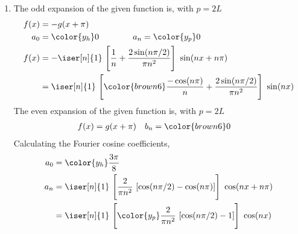 \begin{enumerate}
    \item The odd expansion of the given function is, with $  p = 2L $
          \begin{align}
              f(x) & = -g(x + \pi)                                                     \\
              a_0  & = {\color{y_h} 0} \qquad\qquad
              a_n = {\color{y_p} 0}                                                    \\
              f(x) & = -\iser[n]{1}\ \Bigg[\frac{1}{n} + \frac{2\sin(n\pi/2)}{\pi n^2}
              \Bigg] \ \sin(nx + n\pi)                                                 \\
                   & = \iser[n]{1}\ \Bigg[ {\color{brown6} \frac{-\cos(n\pi)}{n}
                          + \frac{2\sin(n\pi/2)}{\pi n^2} }\Bigg]\ \sin(nx)
          \end{align}
          The even expansion of the given function is, with $  p = 2L $
          \begin{align}
              f(x) & = g(x + \pi)       &
              b_n  & = \color{brown6} 0
          \end{align}
          Calculating the Fourier cosine coefficients,
          \begin{align}
              a_0 & = \color{y_h} \frac{3\pi}{8}                           \\
              a_n & = \iser[n]{1}\ \Bigg[ \frac{2}{\pi n^2}\ [\cos(n\pi/2)
              - \cos(n\pi)]\Bigg]\ \cos(nx + n\pi)                         \\
                  & = \iser[n]{1}\ \Bigg[ {\color{y_p} \frac{2}{\pi n^2}
              \ [\cos(n\pi/2) - 1]}\Bigg]\ \cos(nx)                        \\
          \end{align}


\end{enumerate}